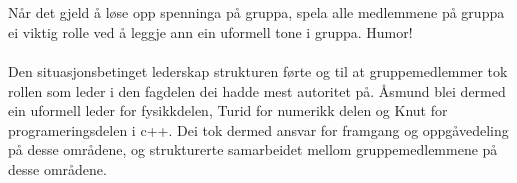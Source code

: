 \\
\\
Når det gjeld å løse opp spenninga på gruppa, spela alle medlemmene på gruppa ei viktig rolle ved å leggje ann ein uformell tone i gruppa.
Humor!
\\
\\
Den situasjonsbetinget lederskap strukturen førte og til at gruppemedlemmer tok rollen som leder i den fagdelen dei hadde mest autoritet på. Åsmund blei dermed ein uformell leder for fysikkdelen, Turid for numerikk delen og Knut for programeringsdelen i c++. Dei tok dermed ansvar for framgang og oppgåvedeling på desse områdene, og strukturerte samarbeidet mellom gruppemedlemmene på desse områdene. 